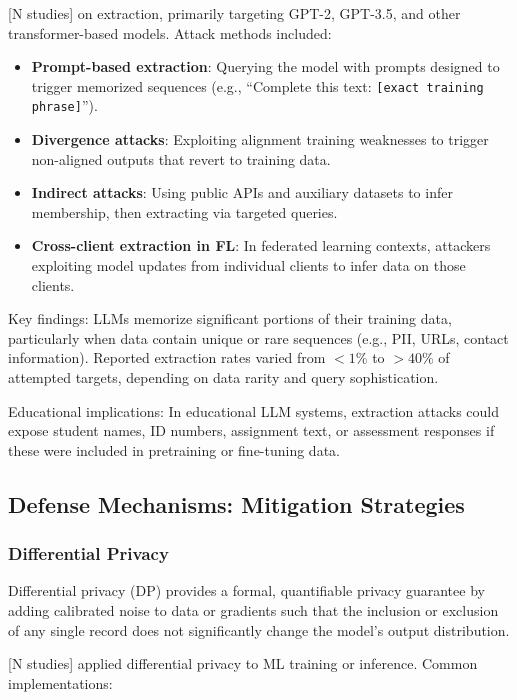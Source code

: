 \documentclass[11pt,a4paper]{article}
\begin{document}
[N studies] on extraction, primarily targeting GPT-2, GPT-3.5, and other transformer-based models. Attack methods included:

\begin{itemize}
\item \textbf{Prompt-based extraction}: Querying the model with prompts designed to trigger memorized sequences (e.g., ``Complete this text: \texttt{[exact training phrase]}'').
\item \textbf{Divergence attacks}: Exploiting alignment training weaknesses to trigger non-aligned outputs that revert to training data.
\item \textbf{Indirect attacks}: Using public APIs and auxiliary datasets to infer membership, then extracting via targeted queries.
\item \textbf{Cross-client extraction in FL}: In federated learning contexts, attackers exploiting model updates from individual clients to infer data on those clients.
\end{itemize}

Key findings: LLMs memorize significant portions of their training data, particularly when data contain unique or rare sequences (e.g., PII, URLs, contact information). Reported extraction rates varied from $<1\%$ to $>40\%$ of attempted targets, depending on data rarity and query sophistication.

Educational implications: In educational LLM systems, extraction attacks could expose student names, ID numbers, assignment text, or assessment responses if these were included in pretraining or fine-tuning data.

\subsection{Defense Mechanisms: Mitigation Strategies}

\subsubsection{Differential Privacy}

Differential privacy (DP) provides a formal, quantifiable privacy guarantee by adding calibrated noise to data or gradients such that the inclusion or exclusion of any single record does not significantly change the model's output distribution.

[N studies] applied differential privacy to ML training or inference. Common implementations:
\end{document}
